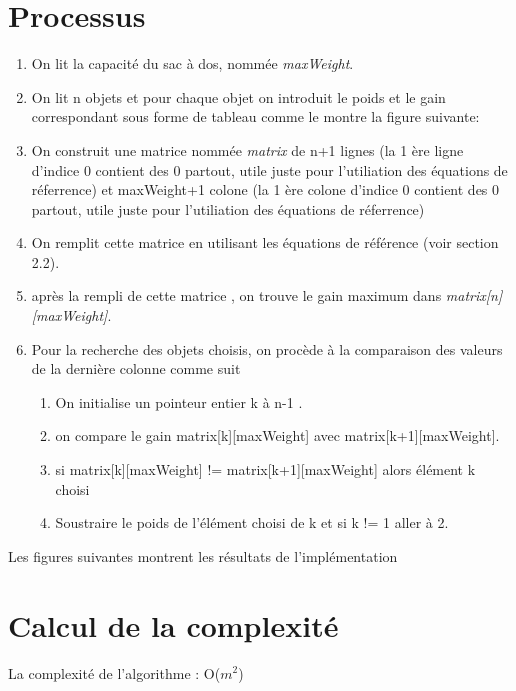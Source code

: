 \documentclass[12pt]{report}
\begin{document}
	\section{Processus}\begin{enumerate}
		\item On lit la capacité du sac à dos, nommée \emph{maxWeight}.
		\item On lit n objets et pour chaque objet on introduit le poids et le gain correspondant sous forme de tableau comme le montre la figure suivante:
		\item On construit une matrice nommée \emph{matrix} de n+1 lignes (la 1 ère ligne d'indice 0 contient des 0 partout, utile juste pour l'utiliation des équations de réferrence) et maxWeight+1 colone (la 1 ère colone d'indice 0 contient des 0 partout, utile juste pour l'utiliation des équations de réferrence)
		\item On remplit cette matrice en utilisant les équations de référence (voir section 2.2).
		\item après la rempli de cette matrice , on trouve le gain maximum dans \emph{matrix[n][maxWeight]}.
		\item Pour la recherche des objets choisis, on procède à la comparaison des valeurs de la dernière colonne comme suit
		\begin{enumerate}
		\item On initialise un pointeur entier k à n-1 .
		\item on compare le gain matrix[k][maxWeight] avec matrix[k+1][maxWeight].
		\item si matrix[k][maxWeight] != matrix[k+1][maxWeight] alors élément k choisi
		\item Soustraire le poids de l'élément choisi de k et si k != 1 aller à 2.
		\end{enumerate}
	\end{enumerate}
	\par{}
	Les figures suivantes montrent les résultats de l'implémentation		
	\section{Calcul de la complexité}
	\par{} 
	
	La complexité de l'algorithme : O($m^{2}$)
	
\end{document}
